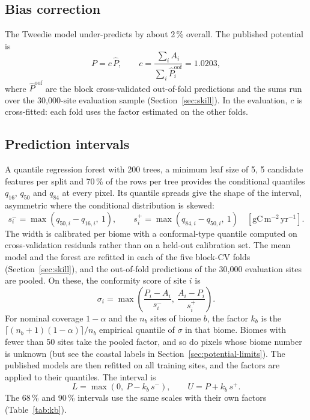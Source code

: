 \documentclass[11pt,a4paper]{article}
\newcommand{\npp}{\ensuremath{\mathrm{gC\,m^{-2}\,yr^{-1}}}}
\begin{document}
\subsection{Bias correction}

The Tweedie model under-predicts by about 2\,\% overall. The published potential is
\begin{equation}
P = c\,\hat P, \qquad c = \frac{\sum_i A_i}{\sum_i \hat P_i^{\text{oof}}} = 1.0203,
\end{equation}
where $\hat P^{\text{oof}}$ are the block cross-validated out-of-fold predictions and the sums
run over the 30,000-site evaluation sample (Section~\ref{sec:skill}). In the evaluation, $c$
is cross-fitted: each fold uses the factor estimated on the other folds.

\subsection{Prediction intervals}

A quantile regression forest \citep{meinshausen2006} with 200 trees, a minimum leaf size of 5,
5 candidate features per split and 70\,\% of the rows per tree provides the conditional
quantiles $q_{16}$, $q_{50}$ and $q_{84}$ at every pixel. Its quantile spreads give the shape of
the interval, asymmetric where the conditional distribution is skewed:
\begin{equation}
s^-_i = \max(q_{50,i} - q_{16,i},\ 1), \qquad s^+_i = \max(q_{84,i} - q_{50,i},\ 1)
\quad [\npp].
\end{equation}
The width is calibrated per biome with a conformal-type quantile \citep{vovk2005,lei2018}
computed on cross-validation residuals rather than on a held-out calibration set. The mean model
and the forest are refitted in each of the five block-CV folds (Section~\ref{sec:skill}), and the
out-of-fold predictions of the 30,000 evaluation sites are pooled. On these, the conformity score
of site $i$ is
\begin{equation}
\sigma_i = \max\left(\frac{P_i - A_i}{s^-_i},\ \frac{A_i - P_i}{s^+_i}\right).
\end{equation}
For nominal coverage $1-\alpha$ and the $n_b$ sites of biome $b$, the factor $k_b$ is the
$\lceil (n_b+1)(1-\alpha) \rceil / n_b$ empirical quantile of $\sigma$ in that biome. Biomes with
fewer than 50 sites take the pooled factor, and so do pixels whose biome number is unknown (but see
the coastal labels in Section~\ref{sec:potential-limits}). The published models are then refitted
on all training sites, and the factors are applied to their quantiles. The interval is
\begin{equation}
L = \max\left(0,\ P - k_b\,s^-\right), \qquad U = P + k_b\,s^+ .
\end{equation}
The 68\,\% and 90\,\% intervals use the same scales with their own factors
(Table~\ref{tab:kb}).
\end{document}

